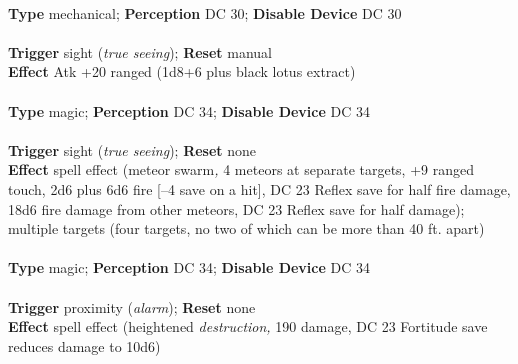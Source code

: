 \\
\textbf{Type }mechanical; \textbf{Perception} DC 30; \textbf{Disable Device} DC 30\\
\\
\textbf{Trigger} sight (\textit{true seeing}); \textbf{Reset} manual\\
\textbf{Effect }Atk +20 ranged (1d8+6 plus black lotus extract)\\

\\
\textbf{Type }magic; \textbf{Perception} DC 34; \textbf{Disable Device} DC 34\\
\\
\textbf{Trigger} sight (\textit{true seeing}); \textbf{Reset} none\\
\textbf{Effect }spell effect (meteor swarm\textit{, }4 meteors at separate targets, +9 ranged touch, 2d6 plus 6d6 fire [–4 save on a hit], DC 23 Reflex save for half fire damage, 18d6 fire damage from other meteors, DC 23 Reflex save for half damage); multiple targets (four targets, no two of which can be more than 40 ft. apart)\\

\\
\textbf{Type }magic; \textbf{Perception} DC 34; \textbf{Disable Device} DC 34\\
\\
\textbf{Trigger} proximity (\textit{alarm}); \textbf{Reset} none\\
\textbf{Effect }spell effect (heightened \textit{destruction, }190 damage, DC 23 Fortitude save reduces damage to 10d6)\\
